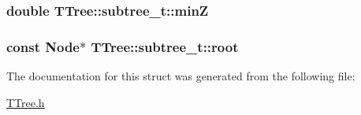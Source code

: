 \subsubsection[{min\+Z}]{\setlength{\rightskip}{0pt plus 5cm}double T\+Tree\+::subtree\+\_\+t\+::min\+Z}\label{structTTree_1_1subtree__t_a3bcb871c4eeeaf275469ab86431381fa}
\hypertarget{structTTree_1_1subtree__t_ab6ebbbb8aed78f23fbe1c5e59a290704}{}
\subsubsection[{root}]{\setlength{\rightskip}{0pt plus 5cm}const {\bf Node}$\ast$ T\+Tree\+::subtree\+\_\+t\+::root}\label{structTTree_1_1subtree__t_ab6ebbbb8aed78f23fbe1c5e59a290704}


The documentation for this struct was generated from the following file\+:\begin{DoxyCompactItemize}
\item 
\hyperlink{TTree_8h}{T\+Tree.\+h}\end{DoxyCompactItemize}
